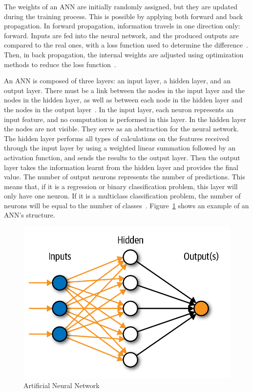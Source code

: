    The weights of an \gls{ANN} are initially randomly assigned, but they are updated during the training process. This is possible by applying both forward and back propagation. In forward propagation, information travels in one direction only: forward. Inputs are fed into the neural network, and the produced outputs are compared to the real ones, with a loss function used to determine the difference~\cite{DivakarForwardNetworks}. Then, in back propagation, the internal weights are adjusted using optimization methods to reduce the loss function~\cite{KimCBP:Method}. 
    
    An \gls{ANN} is composed of three layers: an input layer, a hidden layer, and an output layer. There must be a link between the nodes in the input layer and the nodes in the hidden layer, as well as between each node in the hidden layer and the nodes in the output layer~\cite{Imran2019AClassification}. In the input layer, each neuron represents an input feature, and no computation is performed in this layer. In the hidden layer the nodes are not visible. They serve as an abstraction for the neural network. The hidden layer performs all types of calculations on the features received through the input layer by using a weighted linear summation followed by an activation function, and sends the results to the output layer. Then the output layer takes the information learnt from the hidden layer and provides the final value. The number of output neurons represents the number of predictions. This means that, if it is a regression or binary classification problem, this layer will only have one neuron. If it is a multiclass classification problem, the number of neurons will be equal to the number of classes~\cite{Alaloul2020DataNetworks}. Figure~\ref{fig:ann} shows an example of an \gls{ANN}'s structure.
    
    \begin{figure}[htbp]
        \centering
        \includegraphics[width=0.65\linewidth]{Chapters/Figures/ann.png}
        \caption{Artificial Neural Network~\cite{CastrounisAIExplained}}
        \label{fig:ann}
    \end{figure}

